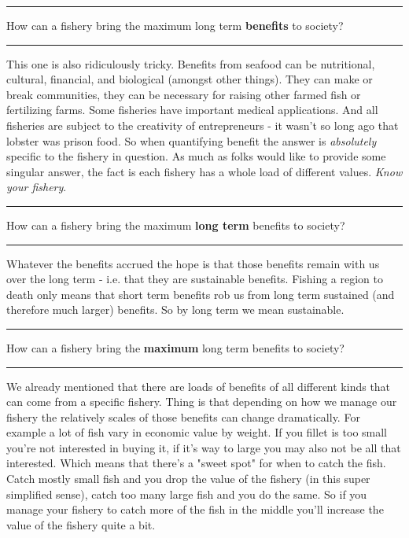 \documentclass[11pt,a5paper]{book}
\begin{document}
\noindent \rule{\textwidth}{0.5pt} 
\noindent How can a fishery bring the maximum long term \textbf{benefits} to society?
\newline
\rule{\textwidth}{0.5pt} 
\vspace{5pt}

This one is also ridiculously tricky. Benefits from seafood can be nutritional, cultural, financial, and biological (amongst other things). They can make or break communities, they can be necessary for raising other farmed fish or fertilizing farms. Some fisheries have important medical applications. And all fisheries are subject to the creativity of entrepreneurs - it wasn't so long ago that lobster was prison food. So when quantifying benefit the answer is \textit{absolutely} specific to the fishery in question. As much as folks would like to provide some singular answer, the fact is each fishery has a whole load of different values. \textit{Know your fishery}.
\newpage

\noindent \rule{\textwidth}{0.5pt} 
\noindent How can a fishery bring the maximum \textbf{long term} benefits to society?
\newline
\rule{\textwidth}{0.5pt} 
\vspace{5pt}

Whatever the benefits accrued the hope is that those benefits remain with us over the long term - i.e. that they are sustainable benefits. Fishing a region to death only means that short term benefits rob us from long term sustained (and therefore much larger) benefits. So by long term we mean sustainable. 
\newpage

\noindent \rule{\textwidth}{0.5pt} 
\noindent How can a fishery bring the \textbf{maximum} long term benefits to society?
\newline
\rule{\textwidth}{0.5pt} 
\vspace{5pt}

We already mentioned that there are loads of benefits of all different kinds that can come from a specific fishery. Thing is that depending on how we manage our fishery the relatively scales of those benefits can change dramatically. For example a lot of fish vary in economic value by weight. If you fillet is too small you're not interested in buying it, if it's way to large you may also not be all that interested. Which means that there's a "sweet spot" for when to catch the fish. Catch mostly small fish and you drop the value of the fishery (in this super simplified sense), catch too many large fish and you do the same. So if you manage your fishery to catch more of the fish in the middle you'll increase the value of the fishery quite a bit. 
\newline
\end{document}
